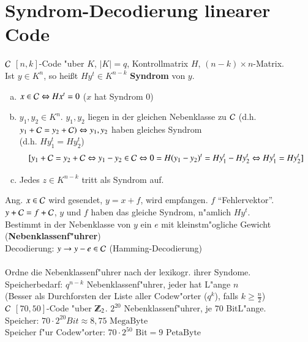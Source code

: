\section{Syndrom-Decodierung linearer Code}
$\mathcal{C}$ $[n,k]$-Code "uber $K$, $\left| K \right| = q$, Kontrollmatrix $H$, $(n-k) \times n$-Matrix.\\
Ist $y \in K^n$, so hei\ss t $Hy^t \in K^{n-k}$ \textbf{Syndrom} von $y$.
\begin{enumerate}[a)]
	\item $x \in \mathcal{C} \Leftrightarrow Hx^t = 0$ ($x$ hat Syndrom $0$)
	\item $y_1,y_2 \in K^n$. $y_1,y_2$ liegen in der gleichen Nebenklasse zu $\mathcal{C}$ (d.h. $y_1 + \mathcal{C} = y_2 + \mathcal{C})\\ \Leftrightarrow y_1,y_2$ haben gleiches Syndrom \\
	(d.h. $Hy_1^t = Hy_2^t$)
	\[
		[y_1 + \mathcal{C} = y_2 + \mathcal{C} \Leftrightarrow y_1 - y_2 \in \mathcal{C} \Leftrightarrow 0 = H(y_1 - y_2)^t = Hy_1^t - Hy_2^t \Leftrightarrow Hy_1^t = Hy_2^t]
	\]
	\item Jedes $z \in K^{n-k}$ tritt als Syndrom auf.	 
\end{enumerate}
Ang. $x \in \mathcal{C}$ wird gesendet, $y=x+f$, wird empfangen. $f$ "`Fehlervektor"'.\\
$y + \mathcal{C} = f + \mathcal{C}$, $y$ und $f$ haben das gleiche Syndrom, n"amlich $Hy^t$.\\
Bestimmt in der Nebenklasse von $y$ ein $e$ mit kleinstm"ogliche Gewicht (\textbf{Nebenklassenf"uhrer}) \\
Decodierung: $y \rightarrow y - e \in \mathcal{C}$ (Hamming-Decodierung)\\
\\
Ordne die Nebenklassenf"uhrer nach der lexikogr. ihrer Syndome. \\
Speicherbedarf: $q^{n-k}$ Nebenklassenf"uhrer, jeder hat L"ange $n$ \\
(Besser als Durchforsten der Liste aller Codew"orter ($q^k$), falls $k \geq \frac{n}{2}$)\\
$\mathcal{C}$ $[70,50]$-Code "uber $\Z_2$. $2^{20}$ Nebenklassenf"uhrer, je $70$ BitL"ange.\\
Speicher: $70 \cdot 2^{20} Bit \approx 8,75 \text{ MegaByte}$ \\
Speicher f"ur Codew"orter: $70 \cdot 2^{50} \text{ Bit} = 9 \text{ PetaByte}$

